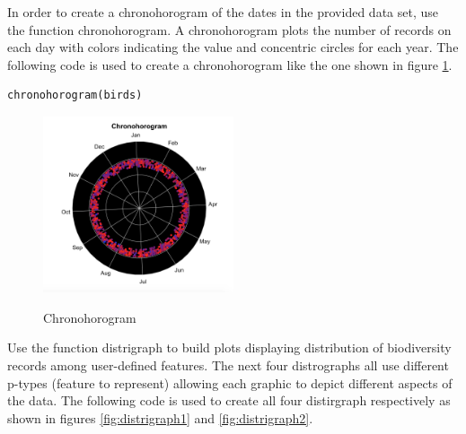 In order to create a chronohorogram of the dates in the provided data set, use the function chronohorogram.
A chronohorogram plots the number of records on each day with colors indicating the value and concentric circles for each year.
The following code is used to create a chronohorogram like the one shown in figure \ref{fig:chronohorogram}.

\begin{lstlisting}
chronohorogram(birds)
\end{lstlisting}

\begin{figure}[htbp!] 
   \centering
      \caption{Chronohorogram}
   \includegraphics[width=0.5\textwidth]{pictures/biodiversity/chronohorogram.jpg} 
   \label{fig:chronohorogram}
\end{figure} 

Use the function distrigraph to build plots displaying distribution of biodiversity records among user-defined features.
The next four distrographs all use different p-types (feature to represent) allowing each graphic to depict different aspects of the data.
The following code is used to create all four distirgraph respectively as shown in figures \ref{fig:distrigraph1} and \ref{fig:distrigraph2}.

